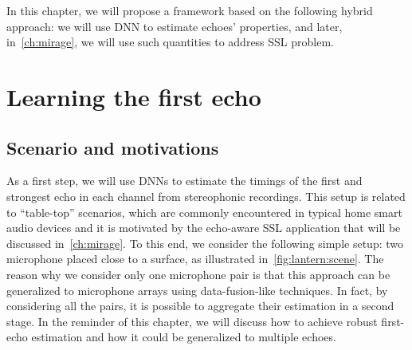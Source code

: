 
\mynewline
In this chapter, we will propose a framework based on the following hybrid approach:
we will use \ac{DNN} to estimate echoes' properties, and later, in~\cref{ch:mirage}, we will use such quantities to address \ac{SSL} problem.

\section{Learning the first echo}\label{sec:lantern:simple}

\subsection{Scenario and motivations}
As a first step, we will use \acp{DNN} to estimate the timings of the first and strongest echo in each channel from stereophonic recordings.
This setup is related to ``table-top'' scenarios, which are commonly encountered in typical home smart audio devices and it is motivated by the echo-aware \acf{SSL} application that will be discussed in~\cref{ch:mirage}.
To this end, we consider the following simple setup: two microphone placed close to a surface, as illustrated in~\cref{fig:lantern:scene}.
The reason why we consider only one microphone pair is that this approach can be generalized to microphone arrays using data-fusion-like techniques.
In fact, by considering all the pairs, it is possible to aggregate their estimation in a second stage.
In the reminder of this chapter, we will discuss how to achieve robust first-echo estimation and how it could be generalized to multiple echoes.

